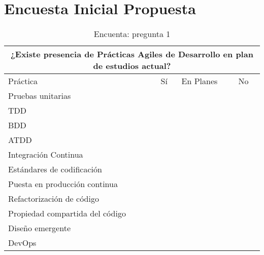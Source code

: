 \section{Encuesta Inicial Propuesta}

\begin{table}[h!]
\begin{tabular}{ |p{8cm}||p{2cm}|p{2cm}|p{1cm}| }
 \toprule[1.5pt]
 \multicolumn{4}{|c|}{\textbf{¿Existe presencia de Prácticas Agiles de Desarrollo en plan de estudios actual?}} \\
\toprule[1.5pt]
Práctica & Sí & En Planes & No \\
\toprule[1.5pt]
    Pruebas unitarias & & & \\
    \hline
    TDD & & & \\
    \hline
    BDD & & & \\
    \hline
    ATDD & & & \\
    \hline
    Integración Continua & & & \\
    \hline
    Estándares de codificación & & & \\
    \hline
    Puesta en producción continua & & & \\
    \hline
    Refactorización de código & & & \\
    \hline
    Propiedad compartida del código & & & \\
    \hline
    Diseño emergente & & & \\ 
    \hline
    DevOps & & & \\
 \hline       
\end{tabular}
    \caption{Encuenta: pregunta 1}
\end{table}

